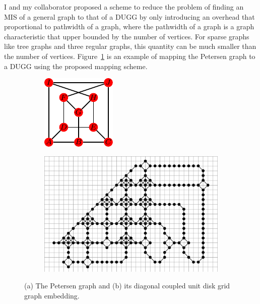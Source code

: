 \documentclass[a4paper]{article}
\newcommand{\<}{\langle}
\renewcommand{\>}{\rangle}
\begin{document}
I and my collaborator proposed a scheme to reduce the problem of finding an MIS of a general graph to that of a DUGG by only introducing an overhead that proportional to pathwidth of a graph,
where the pathwidth of a graph is a graph characteristic that upper bounded by the number of vertices. For sparse graphs like tree graphs and three regular graphs, this quantity can be much smaller than the number of vertices.
Figure~\ref{fig:petersen} is an example of mapping the Petersen graph to a DUGG using the proposed mapping scheme.
\begin{figure}[ht]
\centering
\begin{subfigure}[b]{0.25\textwidth}
\includegraphics[width=\textwidth, trim={0cm 0cm 0cm 0cm}, clip]{petersen.pdf}
\caption{}
\end{subfigure}\hspace{20pt}
\begin{subfigure}[b]{0.6\textwidth}
\includegraphics[width=\textwidth, trim={0cm 0cm 0cm 0cm}, clip]{petersen_mapped.pdf}
\caption{}
\end{subfigure}
\caption{(a) The Petersen graph and (b) its diagonal coupled unit disk grid graph embedding.}\label{fig:petersen}
\end{figure}
\end{document}

